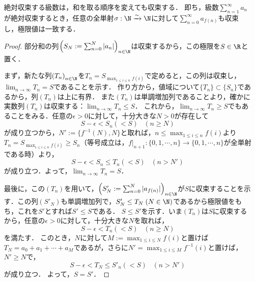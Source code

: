 \documentclass[uplatex, dvipdfmx]{jsreport}
\begin{document}
\begin{proposition}[和の可換性]
    絶対収束する級数は，和を取る順序を変えても収束する．
    即ち，級数$\sum^\infty_{n=1}a_n$が絶対収束するとき，任意の全単射$\sigma:\N\xrightarrow{\sim}\N$に対して$\sum^\infty_{n=0}a_{f(n)}$も収束し，極限値は一致する．
\end{proposition}
\begin{proof}
    部分和の列$\left(S_N:=\sum^N_{n=0}|a_n|\right)_{n\in\N}$は収束するから，この極限を$S\in\R$と置く．

    まず，新たな列$\left(T_n\right)_{n\in\N}$を$T_n=S_{\max_{1\le i\le n}f(i)}$で定めると，この列は収束し，$\lim_{n\to\infty}T_n=S$であることを示す．
    作り方から，値域について$\{T_n\}\subset\{S_n\}$であるから，列$(T_n)$は上に有界．
    また$(T_n)$は単調増加列であることより，確かに実数列$(T_n)$は収束する：$\lim_{n\to\infty}T_n\le S$．
    これから，$\lim_{n\to\infty}T_n\ge S$でもあることをみる．任意の$\epsilon>0$に対して，十分大きな$N>0$が存在して
    \[ S-\epsilon<S_n(<S)\;\;\;(n\ge N) \]
    が成り立つから，$N':=\{f^{-1}(N),N\}$と取れば，$n\le \max_{1\le i\le n}f(i)$より$T_n=S_{\max_{1\le i\le n}f(i)}\ge S_n$（等号成立は，$f|_{n+1}:\{0,1,\cdots,n\}\to\{0,1,\cdots,n\}$が全単射である時）より，
    \[S-\epsilon<S_n\le T_n(<S)\;\;\;(n>N')\]
    が成り立つ．よって，$\lim_{n\to\infty}T_n=S$．

    最後に，この$(T_n)$を用いて，$\left(S'_N:=\sum^N_{n=0}|a_{f(n)}|\right)_{n\in\N}$が$S$に収束することを示す．この列$(S'_N)$も単調増加列で，$S'_N\le T_N\;(N\in\N)$であるから極限値をもち，これを$S'$とすれば$S'\le S$である．
    $S\le S'$を示す．いま$(T_n)$は$S$に収束するから，任意の$\epsilon>0$に対して，十分大きな$N$を取れば，
    \[S-\epsilon<T_n(<S)\;\;\;(n\ge N)\]
    を満たす．
    このとき，$N$に対して$M:=\max_{1\le i\le N}f(i)$と置けば$T_N=a_0+a_1+\cdots+a_M$であるが，さらに$N'=\max_{1\le i\le M}f^{-1}(i)$と置けば，$N'\ge N$で，
    \[S-\epsilon<T_N\le S'_n(<S)\;\;\;(n>N')\]
    が成り立つ．
    よって，$S=S'$．
\end{proof}
\end{document}
